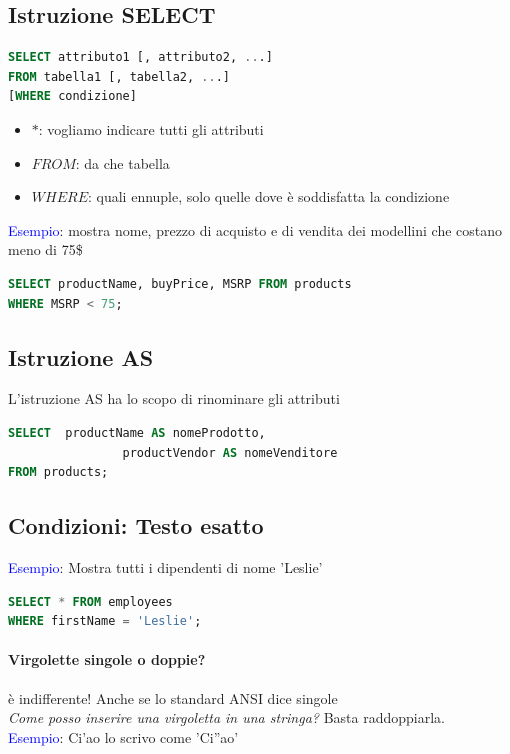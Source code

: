 \documentclass[12pt,a4paper]{article}
\begin{document}
\subsection{Istruzione SELECT}
\flushleft
\begin{lstlisting}[language = SQL]
SELECT attributo1 [, attributo2, ...]
FROM tabella1 [, tabella2, ...]
[WHERE condizione]
\end{lstlisting}
\begin{itemize}
\item $*$: vogliamo indicare tutti gli attributi
\item $FROM$: da che tabella
\item $WHERE$: quali ennuple, solo quelle dove è soddisfatta la condizione
\end{itemize}
\textcolor{blue}{Esempio}: mostra nome, prezzo di acquisto e di vendita dei modellini che costano meno di 75\$\\
\begin{lstlisting}[language = SQL]
SELECT productName, buyPrice, MSRP FROM products
WHERE MSRP < 75;
\end{lstlisting}

\subsection{Istruzione AS}
L'istruzione AS ha lo scopo di rinominare gli attributi\\
\begin{lstlisting}[language = SQL]
SELECT 	productName AS nomeProdotto, 
				productVendor AS nomeVenditore 
FROM products;
\end{lstlisting}

\subsection{Condizioni: Testo esatto}
\textcolor{blue}{Esempio}: Mostra tutti i dipendenti di nome 'Leslie'\\
\begin{lstlisting}[language = SQL]
SELECT * FROM employees
WHERE firstName = 'Leslie';
\end{lstlisting}
\paragraph{Virgolette singole o doppie?} è indifferente! Anche se lo standard ANSI dice singole\\
\textsl{Come posso inserire una virgoletta in una stringa?} Basta raddoppiarla.\\
\textcolor{blue}{Esempio}: Ci'ao lo scrivo come 'Ci''ao'
\end{document}
